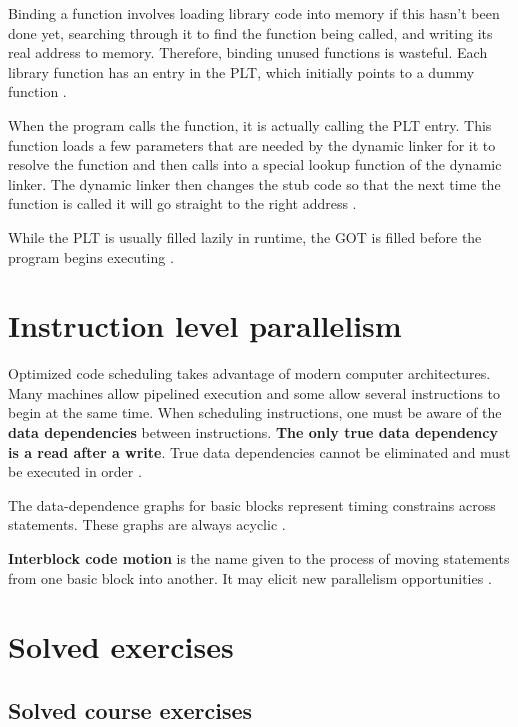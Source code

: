 Binding a function involves loading library code into memory if this hasn't been done yet, searching through it to find the function being called, and writing its real address to memory.
Therefore, binding unused functions is wasteful.
Each library function has an entry in the PLT, which initially points to a dummy function \cite{computer-science-from-the-bottom-up}.

When the program calls the function, it is actually calling the PLT entry.
This function loads a few parameters that are needed by the dynamic linker for it to resolve the function and then calls into a special lookup function of the dynamic linker.
The dynamic linker then changes the stub code so that the next time the function is called it will go straight to the right address \cite{computer-science-from-the-bottom-up}.

While the PLT is usually filled lazily in runtime, the GOT is filled before the program begins executing \cite{computer-science-from-the-bottom-up}.

\section{Instruction level parallelism}

Optimized code scheduling takes advantage of modern computer architectures.
Many machines allow pipelined execution and some allow several instructions to begin at the same time.
When scheduling instructions, one must be aware of the \textbf{data dependencies} between instructions.
\textbf{The only true data dependency is a read after a write}.
True data dependencies cannot be eliminated and must be executed in order \cite[p.~765]{compilers-aho-2007}.

The data-dependence graphs for basic blocks represent timing constrains across statements.
These graphs are always acyclic \cite[p.~765]{compilers-aho-2007}.

\textbf{Interblock code motion} is the name given to the process of moving statements from one basic block into another.
It may elicit new parallelism opportunities \cite[p.~765]{compilers-aho-2007}.

\section{Solved exercises}

\subsection{Solved course exercises}

